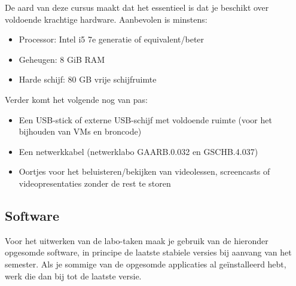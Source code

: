 De aard van deze cursus maakt dat het essentieel is dat je beschikt over voldoende krachtige hardware. Aanbevolen is minstens:

\begin{itemize}
  \item Processor: Intel i5 7e generatie of equivalent/beter
  \item Geheugen: 8 GiB RAM
  \item Harde schijf: 80 GB vrije schijfruimte
\end{itemize}

Verder komt het volgende nog van pas:

\begin{itemize}
  \item Een USB-stick of externe USB-schijf met voldoende ruimte (voor het bijhouden van VMs en broncode)
  \item Een netwerkkabel (netwerklabo GAARB.0.032 en GSCHB.4.037)
  \item Oortjes voor het beluisteren/bekijken van videolessen, screencasts of videopresentaties zonder de rest te storen
\end{itemize}

\subsection{Software}%
\label{ssec:software}

Voor het uitwerken van de labo-taken maak je gebruik van de hieronder opgesomde software, in principe de laatste stabiele versies bij aanvang van het semester. Als je sommige van de opgesomde applicaties al geïnstalleerd hebt, werk die dan bij tot de laatste versie.

